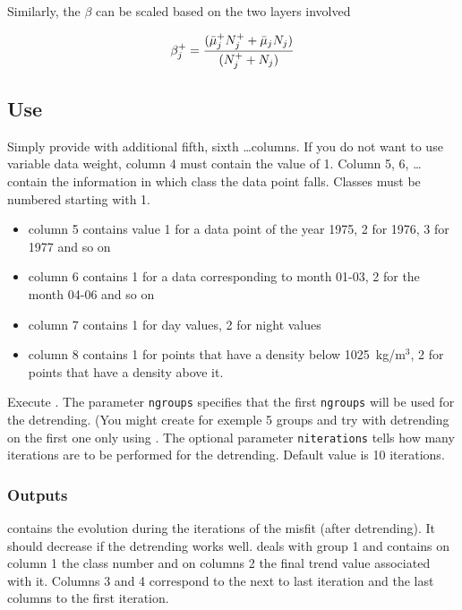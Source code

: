 Similarly, the $ \beta$ can be scaled based on the two layers involved

\begin{equation}
\beta^+_j = { (\bar{\mu}^+_j N_j^+ + \bar{\mu}_j N_j) \over (N_j^++N_j) }
\end{equation}


\subsection{Use}

Simply provide  with additional fifth, sixth \ldots columns. If you do not want to use variable data weight, column 4 must contain the value of 1. Column 5, 6, \ldots contain the information in which class the data point falls. Classes must be numbered starting with 1.

\example
\begin{itemize}
\item
column 5 contains value 1 for a data point of the year 1975, 2 for 1976, 3 for 1977 and so on
\item
column 6 contains 1 for a data corresponding to month 01-03, 2 for the month 04-06 and so on
\item
column 7 contains 1 for day values, 2 for night values
\item
column 8 contains 1 for points that have a density below 1025~kg/m$^3$, 2 for points that have a density above it.
\end{itemize}

Execute . The parameter {\tt ngroups} specifies that the first {\tt ngroups} will be used for the detrending.
(You might create for exemple 5 groups and try with detrending on the first one only using . The optional parameter {\tt niterations} tells how many iterations are to be performed for the detrending. Default value is 10 iterations.

\subsubsection{Outputs}
 contains the evolution during the iterations of the misfit (after detrending). It should decrease if the detrending works well.   deals with group 1 and contains on column 1 the class number and on columns 2 the final trend value associated with it. Columns 3 and 4 correspond to the next to last iteration and the last columns to the first iteration.

